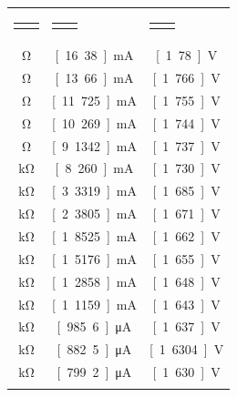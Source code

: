 \documentclass[11pt,a4paper]{article}
\begin{document}
\begin{longtable}[c]{@{}ccc@{}}
    \toprule\addlinespace
    \begin{tabular}{ll}$R_{3}$
    \end{tabular} & \begin{tabular}{ll}$I_{LED}$
\end{tabular} & \begin{tabular}{ll}$V_{LED}$
\end{tabular}
\\\addlinespace
\midrule\endhead
\unit[500]{\si{\ohm}} & \unit[16.38]{\si{\unit{\mA}}} & \unit[1.78]{\si{\volt}}
\\\addlinespace
\unit[600]{\si{\ohm}} & \unit[13.66]{\si{\unit{\mA}}} & \unit[1.766]{\si{\volt}}
\\\addlinespace
\unit[700]{\si{\ohm}} & \unit[11.725]{\si{\unit{\mA}}} & \unit[1.755]{\si{\volt}}
\\\addlinespace
\unit[800]{\si{\ohm}} & \unit[10.269]{\si{\unit{\mA}}} & \unit[1.744]{\si{\volt}}
\\\addlinespace
\unit[900]{\si{\ohm}} & \unit[9.1342]{\si{\unit{\mA}}} & \unit[1.737]{\si{\volt}}
\\\addlinespace
\unit[1]{\si{\kohm}} & \unit[8.260]{\si{\unit{\mA}}} & \unit[1.730]{\si{\volt}}
\\\addlinespace
\unit[2]{\si{\kohm}} & \unit[3.3319]{\si{\unit{\mA}}} & \unit[1.685]{\si{\volt}}
\\\addlinespace
\unit[3]{\si{\kohm}} & \unit[2.3805]{\si{\unit{\mA}}} & \unit[1.671]{\si{\volt}}
\\\addlinespace
\unit[4]{\si{\kohm}} & \unit[1.8525]{\si{\unit{\mA}}} & \unit[1.662]{\si{\volt}}
\\\addlinespace
\unit[5]{\si{\kohm}} & \unit[1.5176]{\si{\unit{\mA}}} & \unit[1.655]{\si{\volt}}
\\\addlinespace
\unit[6]{\si{\kohm}} & \unit[1.2858]{\si{\unit{\mA}}} & \unit[1.648]{\si{\volt}}
\\\addlinespace
\unit[7]{\si{\kohm}} & \unit[1.1159]{\si{\unit{\mA}}} & \unit[1.643]{\si{\volt}}
\\\addlinespace
\unit[8]{\si{\kohm}} & \unit[985.6]{\si{\unit{\uA}}} & \unit[1.637]{\si{\volt}}
\\\addlinespace
\unit[9]{\si{\kohm}} & \unit[882.5]{\si{\unit{\uA}}} & \unit[1.6304]{\si{\volt}}
\\\addlinespace
\unit[10]{\si{\kohm}} & \unit[799.2]{\si{\unit{\uA}}} & \unit[1.630]{\si{\volt}}
\\\addlinespace

\end{longtable}
\end{document}
